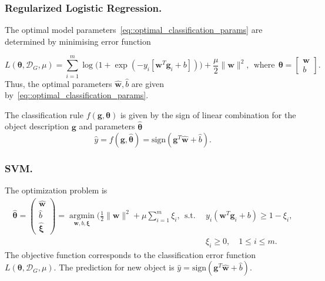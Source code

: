 \documentclass[a4paper,12pt]{article}
\newcommand{\argmin}{\mathop{\arg \min}\limits}
\begin{document}
\subsubsection{Regularized Logistic Regression.}
The optimal model parameters~\eqref{eq::optimal_classification_params} are determined by minimising error function

\begin{equation*}
L(\boldsymbol{\theta}, \mathcal{D}_G, \mu) = \sum_{i=1}^{m} \log\bigl(1 + \exp(-y_i [\boldsymbol{w}^{T} \boldsymbol{g}_i + b])\bigl) + \frac{\mu}{2} \|\boldsymbol{w}\|^2, \:\:\mbox{where}\:\: \boldsymbol{\theta}  = \begin{bmatrix}
\boldsymbol{w} \\ b
\end{bmatrix}.
\end{equation*}
Thus, the optimal parameters $\hat{\boldsymbol{w}}, \hat{b}$ are given by~\eqref{eq::optimal_classification_params}.

The classification rule $f(\boldsymbol{g}, \boldsymbol{\theta})$ is given by the sign of linear combination for the object description $\boldsymbol{g}$ and parameters $\hat{\boldsymbol{\theta}}$
\begin{equation*}
\hat{y} = f(\boldsymbol{g}, \hat{\boldsymbol{\theta}}) = \text{sign}(\boldsymbol{g}^{T} \hat{\boldsymbol{w}} + \hat{b}).
\end{equation*}

\subsubsection{SVM.}
The optimization problem is
\begin{align*}
\hat{\boldsymbol{\theta}}  = \begin{pmatrix}
\hat{\boldsymbol{w}} \\ \hat{b} \\ \hat{\boldsymbol{\xi}}
\end{pmatrix}= \argmin_{\boldsymbol{w}, b, \boldsymbol{\xi}} \bigl( \frac{1}{2} \|\boldsymbol{w}\|^2 + \mu \sum_{i=1}^{m} \xi_i \bigr,\:\:
\mbox{s.t.} \:\: &y_i \left(\boldsymbol{w}^{T} \boldsymbol{g}_i + b\right) \geq 1 - \xi_i,\\
&\xi_i \geq 0, \quad 1 \leq i \leq m.
\end{align*}
The objective function corresponds to the classification error function $L(\boldsymbol{\theta}, \mathcal{D}_G, \mu)$.
The prediction for new object is $
\hat{y} = \text{sign} (\boldsymbol{g}^{T} \hat{\boldsymbol{w}} + \hat{b})$.
\end{document}
